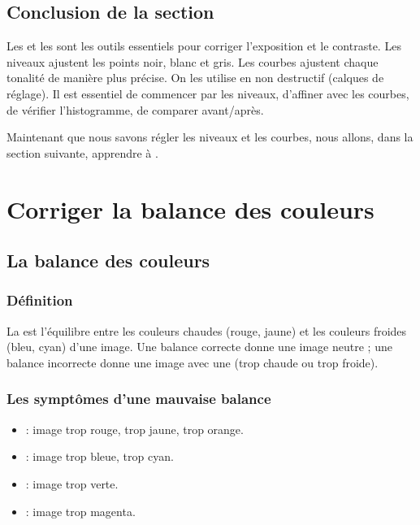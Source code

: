 \subsection*{Conclusion de la section}

Les  et les  sont les outils essentiels pour corriger l'exposition et le contraste. Les niveaux ajustent les points noir, blanc et gris. Les courbes ajustent chaque tonalité de manière plus précise. On les utilise en non destructif (calques de réglage). Il est essentiel de commencer par les niveaux, d'affiner avec les courbes, de vérifier l'histogramme, de comparer avant/après.

Maintenant que nous savons régler les niveaux et les courbes, nous allons, dans la section suivante, apprendre à .

\section{Corriger la balance des couleurs}

\subsection{La balance des couleurs}

\subsubsection{Définition}

La  est l'équilibre entre les couleurs chaudes (rouge, jaune) et les couleurs froides (bleu, cyan) d'une image. Une balance correcte donne une image neutre ; une balance incorrecte donne une image avec une  (trop chaude ou trop froide).

\subsubsection{Les symptômes d'une mauvaise balance}

\begin{itemize}
    \item {} : image trop rouge, trop jaune, trop orange.
    \item {} : image trop bleue, trop cyan.
    \item {} : image trop verte.
    \item {} : image trop magenta.
\end{itemize}

